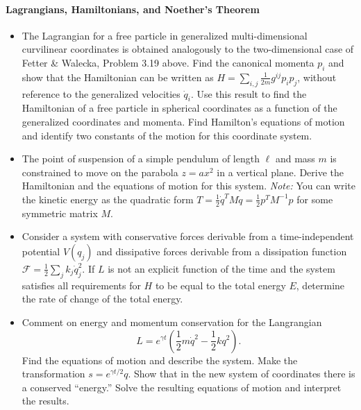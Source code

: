 \documentclass[letterpaper,11pt]{article}
\begin{document}
\paragraph*{Lagrangians, Hamiltonians, and Noether's Theorem}
\begin{itemize}
 \item The Lagrangian for a free particle in generalized multi-dimensional curvilinear coordinates is obtained analogously to the two-dimensional case of Fetter \& Walecka, Problem 3.19 above.  Find the canonical momenta $p_i$ and show that the Hamiltonian can be written as $H = \sum_{i,j} \frac{1}{2m} g^{ij} p_i p_j$, without reference to the generalized velocities $\dot{q}_i$.  Use this result to find the Hamiltonian of a free particle in spherical coordinates as a function of the generalized coordinates and momenta.  Find Hamilton's equations of motion and identify two constants of the motion for this coordinate system.
 \item The point of suspension of a simple pendulum of length $\ell$ and mass $m$ is constrained to move on the parabola $z = a x^2$ in a vertical plane.  Derive the Hamiltonian and the equations of motion for this system.  \textit{Note:} You can write the kinetic energy as the quadratic form $T = \frac{1}{2} \dot{q}^T M \dot{q} = \frac{1}{2} p^T M^{-1} p$ for some symmetric matrix $M$.
 \item Consider a system with conservative forces derivable from a time-independent potential $V(q_j)$ and dissipative forces derivable from a dissipation function $\mathcal{F} = \frac{1}{2}\sum_j k_j \dot{q}_j^2$.  If $L$ is not an explicit function of the time and the system satisfies all requirements for $H$ to be equal to the total energy $E$, determine the rate of change of the total energy.
 \item Comment on energy and momentum conservation for the Langrangian
 \begin{equation*}
  L = e^{\gamma t} \left( \frac{1}{2}m \dot{q}^2 - \frac{1}{2}k q^2 \right).
 \end{equation*}
 Find the equations of motion and describe the system.  Make the transformation $s = e^{\gamma t/2}q$.  Show that in the new system of coordinates there is a conserved ``energy.''  Solve the resulting equations of motion and interpret the results.
\end{itemize}
\end{document}
